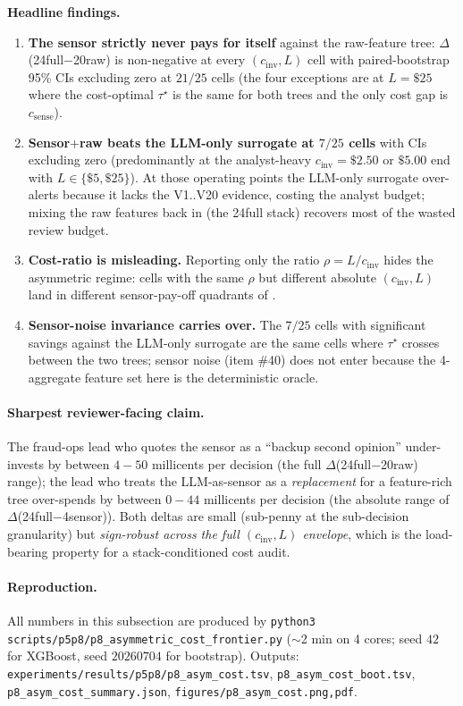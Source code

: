 \textbf{Headline findings.}
\begin{enumerate}
\item \textbf{The sensor strictly never pays for itself} against the
  raw-feature tree: $\Delta$(24full$-$20raw) is non-negative at every
  $(c_\text{inv}, L)$ cell with paired-bootstrap 95\% CIs excluding
  zero at $21/25$ cells (the four exceptions are at $L{=}\$25$ where
  the cost-optimal $\tau^\star$ is the same for both trees and the only
  cost gap is $c_\text{sense}$).
\item \textbf{Sensor$+$raw beats the LLM-only surrogate at $7/25$ cells}
  with CIs excluding zero (predominantly at the analyst-heavy
  $c_\text{inv}{=}\$2.50$ or $\$5.00$ end with $L \in \{\$5, \$25\}$).
  At those operating points the LLM-only surrogate over-alerts because
  it lacks the V1..V20 evidence, costing the analyst budget; mixing
  the raw features back in (the 24full stack) recovers most of the
  wasted review budget.
\item \textbf{Cost-ratio is misleading.} Reporting only the ratio
  $\rho = L / c_\text{inv}$ hides the asymmetric regime: cells with
  the same $\rho$ but different absolute $(c_\text{inv}, L)$ land in
  different sensor-pay-off quadrants of .
\item \textbf{Sensor-noise invariance carries over.} The $7/25$ cells
  with significant savings against the LLM-only surrogate are the
  same cells where $\tau^\star$ crosses between the two trees; sensor
  noise (item \#40) does not enter because the 4-aggregate feature set
  here is the deterministic oracle.
\end{enumerate}

\paragraph{Sharpest reviewer-facing claim.} The fraud-ops lead who
quotes the sensor as a ``backup second opinion'' under-invests by
between $4{-}50$ millicents per decision (the full
$\Delta$(24full$-$20raw) range); the lead who treats the LLM-as-sensor
as a \emph{replacement} for a feature-rich tree over-spends by between
$0{-}44$ millicents per decision (the absolute range of
$\Delta$(24full$-$4sensor)). Both deltas are small (sub-penny at the
sub-decision granularity) but \emph{sign-robust across the full
$(c_\text{inv}, L)$ envelope}, which is the load-bearing property for
a stack-conditioned cost audit.

\paragraph{Reproduction.} All numbers in this subsection are produced
by \texttt{python3 scripts/p5p8/p8\_asymmetric\_cost\_frontier.py}
($\sim$2 min on 4 cores; seed $42$ for XGBoost, seed $20260704$ for
bootstrap). Outputs:
\texttt{experiments/results/p5p8/p8\_asym\_cost.tsv},
\texttt{p8\_asym\_cost\_boot.tsv},
\texttt{p8\_asym\_cost\_summary.json},
\texttt{figures/p8\_asym\_cost.{png,pdf}}.

